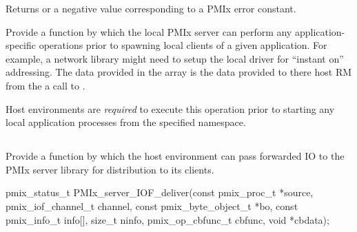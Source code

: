 Returns  or a negative value corresponding to a PMIx error constant.


\descr

Provide a function by which the local \ac{PMIx} server can perform any application-specific operations prior to spawning local clients of a given application. For example, a network library might need to setup the local driver for ``instant on'' addressing. The data provided in the  array is the data provided to there host \ac{RM} from the a call to .

\advicermstart
Host environments are \textit{required} to execute this operation prior to starting any local application processes from the specified namespace.
\advicermend

\subsection{}

\summary

Provide a function by which the host environment can pass forwarded \ac{IO} to the \ac{PMIx} server library for distribution to its clients.

\format

\cspecificstart
\begin{codepar}
pmix_status_t
PMIx_server_IOF_deliver(const pmix_proc_t *source,
                        pmix_iof_channel_t channel,
                        const pmix_byte_object_t *bo,
                        const pmix_info_t info[], size_t ninfo,
                        pmix_op_cbfunc_t cbfunc, void *cbdata);
\end{codepar}
\cspecificend

\begin{arglist}
\end{arglist}

